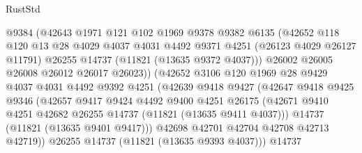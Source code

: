 \begin{lexlean}{RustStd}
\begin{coremodule}
                        @9384
                        (@42643
                          @1971
                          @121
                          @102
                          @1969
                          @9378
                          @9382
                          @6135
                          (@42652
                            @118
                            @120
                            @13
                            @28
                            @4029
                            @4037
                            @4031
                            @4492
                            @9371
                            @4251
                            (@26123 @4029 @26127 @11791)
                            @26255
                            @14737
                            (@11821 (@13635 @9372 @4037)))
                          @26002
                          @26005
                          @26008
                          @26012
                          @26017
                          @26023))
                      (@42652
                        @3106
                        @120
                        @1969
                        @28
                        @9429
                        @4037
                        @4031
                        @4492
                        @9392
                        @4251
                        (@42639
                          @9418
                          @9427
                          (@42647
                            @9418
                            @9425
                            @9346
                            (@42657
                              @9417
                              @9424
                              @4492
                              @9400
                              @4251
                              @26175
                              (@42671
                                @9410
                                @4251
                                @42682
                                @26255
                                @14737
                                (@11821 (@13635 @9411 @4037)))
                              @14737
                              (@11821 (@13635 @9401 @9417)))
                            @42698
                            @42701
                            @42704
                            @42708
                            @42713
                            @42719))
                        @26255
                        @14737
                        (@11821 (@13635 @9393 @4037)))
                      @14737

\end{coremodule}
\end{lexlean}
